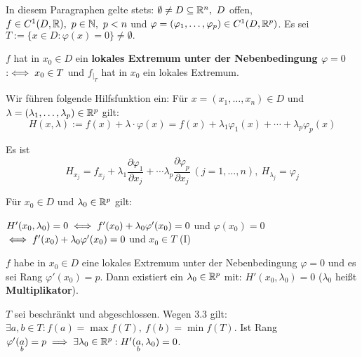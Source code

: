 \documentclass[a4paper,twoside,DIV15,BCOR12mm]{scrbook}
\begin{document}
In diesem Paragraphen gelte stets: $\emptyset \ne D \subseteq \mathbb{R}^n,\ D$ offen, $f \in C^1(D,\MdR),\ p \in \MdN,\ p<n$ und $\varphi = (\varphi_1,\ldots,\varphi_p) \in C^1(D,\mathbb{R}^p)$. Es sei $T:=\{x\in D: \varphi(x) = 0\} \ne \emptyset.$

\begin{definition}
$f$ hat in $x_0\in D$ ein \textbf{lokales Extremum unter der Nebenbedingung $\varphi = 0$} $:\iff x_0 \in T$ und $f_{|_T}$ hat in $x_0$ ein lokales Extremum.
\end{definition}

Wir führen folgende Hilfsfunktion ein: Für $x=(x_1,\ldots,x_n) \in D$ und $\lambda = (\lambda_1,\ldots,\lambda_p) \in \mathbb{R}^p$ gilt: $$H(x,\lambda) := f(x) + \lambda\cdot\varphi(x) = f(x) + \lambda_1\varphi_1(x) + \cdots + \lambda_p\varphi_p(x)$$

Es ist $$H_{x_j} = f_{x_j} + \lambda_1\frac{\partial\varphi_1}{\partial x_j} + \cdots \lambda_p\frac{\partial\varphi_p}{\partial x_j}\ (j=1,\ldots,n),\ H_{\lambda_j} = \varphi_j$$

Für $x_0 \in D$ und $\lambda_0 \in \mathbb{R}^p$ gilt:

$H'(x_0,\lambda_0) = 0 \iff f'(x_0) + \lambda_0\varphi'(x_0) = 0$ und $\varphi(x_0) = 0$\\
$\iff f'(x_0) + \lambda_0\varphi'(x_0) = 0$ und $x_0 \in T$ (I)

\begin{satz}
$f$ habe in $x_0\in D$ eine lokales Extremum unter der Nebenbedingung $\varphi=0$ und es sei Rang $\varphi'(x_0) = p$. Dann existiert ein $\lambda_0 \in \mathbb{R}^p$ mit: $H'(x_0,\lambda_0) = 0$ ($\lambda_0$ heißt \textbf{Multiplikator}).
\end{satz}

\begin{folgerung}
$T$ sei beschränkt und abgeschlossen. Wegen 3.3 gilt: $\exists a,b \in T: f(a) = \max f(T),\ f(b) = \min f(T).$ Ist Rang $\varphi'(\underset{b}{a}) = p \implies \exists \lambda_0 \in \mathbb{R}^p: H'(\underset{b}{a},\lambda_0) = 0$.
\end{folgerung}
\end{document}
